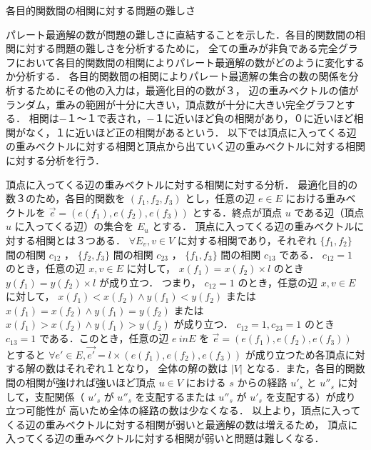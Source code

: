 \documentclass[12pt]{optlab-bachelor}
\begin{document}
\begin{description}
  \item[各目的関数間の相関に対する問題の難しさ]
\end{description}

パレート最適解の数が問題の難しさに直結することを示した．各目的関数間の相関に対する問題の難しさを分析するために，
全ての重みが非負である完全グラフにおいて各目的関数間の相関によりパレート最適解の数がどのように変化するか分析する．
各目的関数間の相関によりパレート最適解の集合の数の関係を分析するためにその他の入力は，最適化目的の数が３，
辺の重みベクトルの値がランダム，重みの範囲が十分に大きい，頂点数が十分に大きい完全グラフとする．
相関は−１〜１で表され，−１に近いほど負の相関があり，０に近いほど相関がなく，１に近いほど正の相関があるという．
以下では頂点に入ってくる辺の重みベクトルに対する相関と頂点から出ていく辺の重みベクトルに対する相関に対する分析を行う．

頂点に入ってくる辺の重みベクトルに対する相関に対する分析．
最適化目的の数３のため，各目的関数を $(f_1,f_2,f_3)$ とし，任意の辺 $e　\in E$ における重みベクトルを
 $\vec{e}=(e(f_1),e(f_2),e(f_3))$ とする．終点が頂点 $u$ である辺（頂点 $u$ に入ってくる辺）の集合を $E_u$ とする．
頂点に入ってくる辺の重みベクトルに対する相関とは３つある． $\forall E_v , v \in V$ に対する相関であり，それぞれ
 $\{f_1,f_2\}$ 間の相関 $c_{12}$ ， $\{f_2,f_3\}$ 間の相関 $c_{23}$ ， $\{f_1,f_3\}$ 間の相関 $c_{13}$ である．
$c_{12}=1$ のとき，任意の辺 $x,v\in E$ に対して， $x(f_1)=x(f_2)\times l$ のとき $y(f_1)=y(f_2)\times l$ が成り立つ．
つまり， $c_{12}=1$ のとき，任意の辺 $x,v\in E$ に対して， $x(f_1)<x(f_2) \land y(f_1)<y(f_2)$ または
 $x(f_1)=x(f_2) \land y(f_1)=y(f_2)$ または $x(f_1)>x(f_2) \land y(f_1)>y(f_2)$ が成り立つ．
$c_{12}=1,c_{23}=1$ のとき $c_{13}=1$ である．このとき，任意の辺 $e \ inE$ を $\vec{e}=(e(f_1),e(f_2),e(f_3))$ とすると
 $\forall e'\in E,\vec{e'} = l\times(e(f_1),e(f_2),e(f_3))$ が成り立つため各頂点に対する解の数はそれぞれ１となり，
全体の解の数は $|V|$ となる．また，各目的関数間の相関が強ければ強いほど頂点 $u\in V$ における $s$ からの経路 $u'_{s}$ と
 $u''_{s}$ に対して，支配関係（ $u'_{s}$ が $u''_{s}$ を支配するまたは $u''_{s}$ が $u'_{s}$ を支配する）が成り立つ可能性が
高いため全体の経路の数は少なくなる．
以上より，頂点に入ってくる辺の重みベクトルに対する相関が弱いと最適解の数は増えるため，
頂点に入ってくる辺の重みベクトルに対する相関が弱いと問題は難しくなる．
\end{document}
